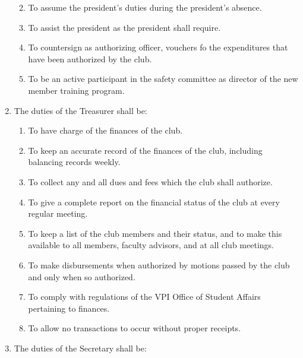 \documentclass[
]{article}
\providecommand{\tightlist}{%
  \setlength{\itemsep}{0pt}\setlength{\parskip}{0pt}}
\begin{document}
\begin{enumerate}
  \begin{enumerate}
  \def\labelenumii{\Alph{enumii}.}
  \tightlist
  \item
    To assume the president's duties during the president's absence.
  \item
    To assist the president as the president shall require.
  \item
    To countersign as authorizing officer, vouchers fo the expenditures
    that have been authorized by the club.
  \item
    To be an active participant in the safety committee as director of
    the new member training program.
  \end{enumerate}
\item
  The duties of the Treasurer shall be:

  \begin{enumerate}
  \def\labelenumii{\Alph{enumii}.}
  \tightlist
  \item
    To have charge of the finances of the club.
  \item
    To keep an accurate record of the finances of the club, including
    balancing records weekly.
  \item
    To collect any and all dues and fees which the club shall authorize.
  \item
    To give a complete report on the financial status of the club at
    every regular meeting.
  \item
    To keep a list of the club members and their status, and to make
    this available to all members, faculty advisors, and at all club
    meetings.
  \item
    To make disbursements when authorized by motions passed by the club
    and only when so authorized.
  \item
    To comply with regulations of the VPI Office of Student Affairs
    pertaining to finances.
  \item
    To allow no transactions to occur without proper receipts.
  \end{enumerate}
\item
  The duties of the Secretary shall be:


\end{enumerate}
\end{document}
